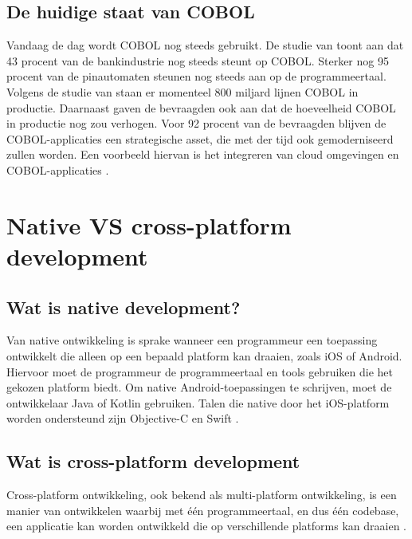 \subsection{De huidige staat van COBOL}
Vandaag de dag wordt COBOL nog steeds gebruikt. De studie van \textcite{Reuters2017} toont aan dat 43 procent van de bankindustrie nog steeds steunt op COBOL. Sterker nog 95 procent van de pinautomaten steunen nog steeds aan op de programmeertaal. Volgens de studie van \textcite{MicroFocus2022} staan er momenteel 800 miljard lijnen COBOL in productie. Daarnaast gaven de bevraagden ook aan dat de hoeveelheid COBOL in productie nog zou verhogen. 
Voor 92 procent van de bevraagden blijven de COBOL-applicaties een strategische asset, die met der tijd ook gemoderniseerd zullen worden. Een voorbeeld hiervan is het integreren van cloud omgevingen en COBOL-applicaties \autocite{MicroFocus2022}.

\section{Native VS cross-platform development}
\subsection{Wat is native development?}
Van native ontwikkeling is sprake wanneer een programmeur een toepassing ontwikkelt die alleen op een bepaald platform kan draaien, zoals iOS of Android. Hiervoor moet de programmeur de programmeertaal en tools \autocite{Marchuk} gebruiken die het gekozen platform biedt.
Om native Android-toepassingen te schrijven, moet de ontwikkelaar Java of Kotlin gebruiken. Talen die native door het iOS-platform worden ondersteund zijn Objective-C en Swift \autocite{Schmitt2022}.

\subsection{Wat is cross-platform development}
Cross-platform ontwikkeling, ook bekend als multi-platform ontwikkeling, is een manier van ontwikkelen waarbij met één programmeertaal, en dus één codebase, een applicatie kan worden ontwikkeld die op verschillende platforms kan draaien \autocite{KotlinFoundation2022}.

